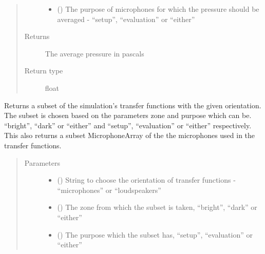 \documentclass[letterpaper,10pt,english]{sphinxmanual}
\begin{document}
\begin{fulllineitems}
\begin{fulllineitems}
\begin{quote}
\begin{description}
\begin{itemize}
\item {} 
 () \textendash{} The purpose of microphones for which the pressure should be averaged -  “setup”, “evaluation” or
“either”

\end{itemize}

\item[{Returns}] \leavevmode
The average pressure in pascals

\item[{Return type}] \leavevmode
float

\end{description}\end{quote}

\end{fulllineitems}


\begin{fulllineitems}
\label{\detokenize{source/pyzones:pyzones.Simulation.get_tf_subset}}
Returns a subset of the simulation’s transfer functions with the given orientation. The subset is chosen based
on the parameters zone and purpose which can be. “bright”, “dark” or “either” and “setup”, “evaluation” or
“either” respectively. This also returns a subset MicrophoneArray of the the microphones used in the transfer
functions.
\begin{quote}\begin{description}
\item[{Parameters}] \leavevmode\begin{itemize}
\item {} 
 () \textendash{} String to choose the orientation of transfer functions - “microphones” or “loudspeakers”

\item {} 
 () \textendash{} The zone from which the subset is taken, “bright”, “dark” or “either”

\item {} 
 () \textendash{} The purpose which the subset has, “setup”, “evaluation” or “either”


\end{itemize}
\end{description}
\end{quote}
\end{fulllineitems}
\end{fulllineitems}
\end{document}
